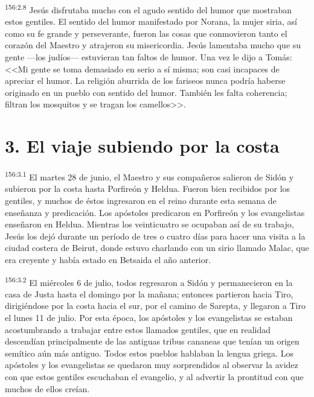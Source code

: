 \par 
\textsuperscript{156:2.8} Jesús disfrutaba mucho con el agudo sentido del humor que mostraban estos gentiles. El sentido del humor manifestado por Norana, la mujer siria, así como su fe grande y perseverante, fueron las cosas que conmovieron tanto el corazón del Maestro y atrajeron su misericordia. Jesús lamentaba mucho que su gente ---los judíos--- estuvieran tan faltos de humor. Una vez le dijo a Tomás: <<Mi gente se toma demasiado en serio a sí misma; son casi incapaces de apreciar el humor. La religión aburrida de los fariseos nunca podría haberse originado en un pueblo con sentido del humor. También les falta coherencia; filtran los mosquitos y se tragan los camellos>>.

\section*{3. El viaje subiendo por la costa}
\par 
\textsuperscript{156:3.1} El martes 28 de junio, el Maestro y sus compañeros salieron de Sidón y subieron por la costa hasta Porfireón y Heldua. Fueron bien recibidos por los gentiles, y muchos de éstos ingresaron en el reino durante esta semana de enseñanza y predicación. Los apóstoles predicaron en Porfireón y los evangelistas enseñaron en Heldua. Mientras los veinticuatro se ocupaban así de su trabajo, Jesús los dejó durante un período de tres o cuatro días para hacer una visita a la ciudad costera de Beirut, donde estuvo charlando con un sirio llamado Malac, que era creyente y había estado en Betsaida el año anterior.

\par 
\textsuperscript{156:3.2} El miércoles 6 de julio, todos regresaron a Sidón y permanecieron en la casa de Justa hasta el domingo por la mañana; entonces partieron hacia Tiro, dirigiéndose por la costa hacia el sur, por el camino de Sarepta, y llegaron a Tiro el lunes 11 de julio. Por esta época, los apóstoles y los evangelistas se estaban acostumbrando a trabajar entre estos llamados gentiles, que en realidad descendían principalmente de las antiguas tribus cananeas que tenían un origen semítico aún más antiguo. Todos estos pueblos hablaban la lengua griega. Los apóstoles y los evangelistas se quedaron muy sorprendidos al observar la avidez con que estos gentiles escuchaban el evangelio, y al advertir la prontitud con que muchos de ellos creían.


